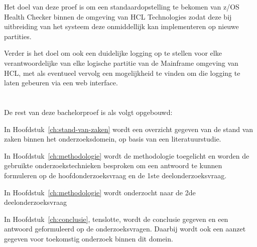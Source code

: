 Het doel van deze proef is om een standaardopstelling te bekomen van z/OS Health Checker binnen de omgeving van HCL Technologies zodat deze bij uitbreiding van het systeem deze onmiddellijk kan implementeren op nieuwe partities.

Verder is het doel om ook een duidelijke logging op te stellen voor elke verantwoordelijke van elke logische partitie van de Mainframe omgeving van HCL, met als eventueel vervolg een mogelijkheid te vinden om die logging te laten gebeuren via een web interface.

\section{}
\label{sec:opzet-bachelorproef}


De rest van deze bachelorproef is als volgt opgebouwd:

In Hoofdstuk~\ref{ch:stand-van-zaken} wordt een overzicht gegeven van de stand van zaken binnen het onderzoeksdomein, op basis van een literatuurstudie.

In Hoofdstuk~\ref{ch:methodologie} wordt de methodologie toegelicht en worden de gebruikte onderzoekstechnieken besproken om een antwoord te kunnen formuleren op de hoofdonderzoeksvraag en de 1ste deelonderzoeksvraag.

In Hoofdstuk~\ref{ch:methodologie} wordt onderzocht naar de 2de deelonderzoeksvraag 



In Hoofdstuk~\ref{ch:conclusie}, tenslotte, wordt de conclusie gegeven en een antwoord geformuleerd op de onderzoeksvragen. Daarbij wordt ook een aanzet gegeven voor toekomstig onderzoek binnen dit domein.